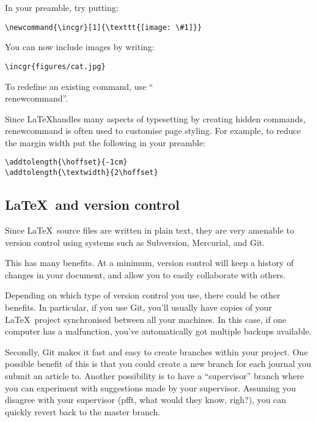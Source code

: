 In your preamble, try putting:

\begin{verbatim}
\newcommand{\incgr}[1]{\texttt{[image: \#1]}}
\end{verbatim}

You can now include images by writing:

\begin{verbatim}
\incgr{figures/cat.jpg}
\end{verbatim}

To redefine an existing command, use ``\\renewcommand''.

Since \LaTeX handles many aspects of typesetting by creating hidden commands,
\\renewcommand is often used to customise page styling.
For example, to reduce the margin width put the following in your preamble:

\begin{verbatim}
\addtolength{\hoffset}{-1cm}
\addtolength{\textwidth}{2\hoffset}
\end{verbatim}


\subsection{\LaTeX\ and version control}

Since \LaTeX\ source files are written in plain text,
they are very amenable to version control using systems such
as Subversion, Mercurial, and Git.

This has many benefits.
At a minimum, version control will keep a history of changes in your document,
and allow you to easily collaborate with others.

Depending on which type of version control you use, there could be other benefits.
In particular, if you use Git,
you'll usually have copies of your \LaTeX\ project
synchronised between all your machines.
In this case, if one computer has a malfunction,
you've automatically got multiple backups available.

Secondly, Git makes it fast and easy to create branches within your project.
One possible benefit of this is that you could create a new branch for
each journal you submit an article to.
Another possibility is to have a ``supervisor'' branch
where you can experiment with suggestions made by your supervisor.
Assuming you disagree with your supervisor
(pfft, what would they know, righ?),
you can quickly revert back to the master branch.

